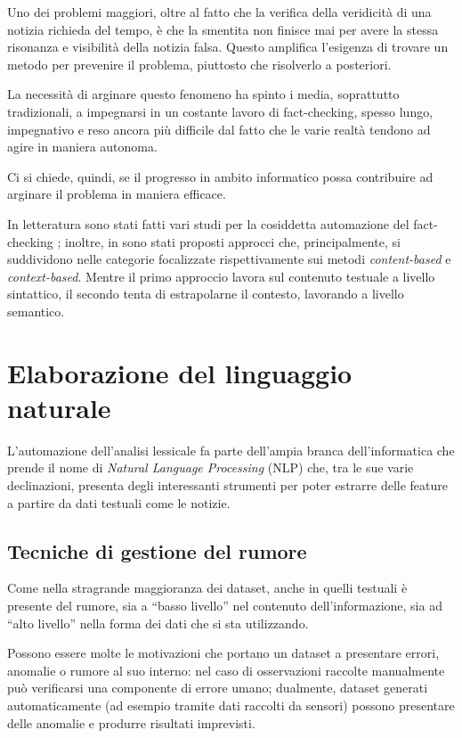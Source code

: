 \documentclass[12pt]{report}
\theoremstyle{definition}
\begin{document}
Uno dei problemi maggiori, oltre al fatto che la verifica della veridicità di una notizia richieda del tempo, è che la smentita non finisce mai per avere la stessa risonanza e visibilità della notizia falsa. Questo amplifica l'esigenza di trovare un metodo per prevenire il problema, piuttosto che risolverlo a posteriori.

La necessità di arginare questo fenomeno ha spinto i media, soprattutto tradizionali, a impegnarsi in un costante lavoro di fact-checking, spesso lungo, impegnativo e reso ancora più difficile dal fatto che le varie realtà tendono ad agire in maniera autonoma.

Ci si chiede, quindi, se il progresso in ambito informatico possa contribuire ad arginare il problema in maniera efficace.

In letteratura sono stati fatti vari studi per la cosiddetta automazione del fact-checking \cite{5, 6, 8, 9, 10, 11, 12, 13, 17}; inoltre, in \cite{15, 16, 21} sono stati proposti approcci che, principalmente, si suddividono nelle categorie focalizzate rispettivamente sui metodi \textit{content-based} e \textit{context-based}.
Mentre il primo approccio lavora sul contenuto testuale a livello sintattico, il secondo tenta di estrapolarne il contesto, lavorando a livello semantico.

\section{Elaborazione del linguaggio naturale} \label{nlp}
L'automazione dell'analisi lessicale fa parte dell'ampia branca dell'informatica che prende il nome di \textit{Natural Language Processing} (NLP) che, tra le sue varie declinazioni, presenta degli interessanti strumenti per poter estrarre delle feature a partire da dati testuali come le notizie.


\subsection{Tecniche di gestione del rumore} \label{clean}
Come nella stragrande maggioranza dei dataset, anche in quelli testuali è presente del rumore, sia a ``basso livello'' nel contenuto dell'informazione, sia ad ``alto livello'' nella forma dei dati che si sta utilizzando.

Possono essere molte le motivazioni che portano un dataset a presentare errori, anomalie o rumore al suo interno: 
nel caso di osservazioni raccolte manualmente può verificarsi una componente di errore umano; dualmente, dataset generati automaticamente (ad esempio tramite dati raccolti da sensori) possono presentare delle anomalie e produrre risultati imprevisti.
\end{document}
